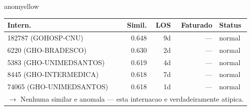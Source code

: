 \documentclass[a4paper,10pt]{article}
\begin{document}
\begin{anomalycard}[Internacao 5751 | GHO-PETROBRAS | MODERADO (z=2.04)]{anomyellow}
\begin{tabular}{l r r r l}\toprule\textbf{Intern.} & \textbf{Simil.} & \textbf{LOS} & \textbf{Faturado} & \textbf{Status} \\\midrule
182787 (GOHOSP-CNU) & 0.648 & 9d & --- & \textcolor{jcubeblue}{normal} \\
6220 (GHO-BRADESCO) & 0.630 & 2d & --- & \textcolor{jcubeblue}{normal} \\
5383 (GHO-UNIMEDSANTOS) & 0.619 & 4d & --- & \textcolor{jcubeblue}{normal} \\
8445 (GHO-INTERMEDICA) & 0.618 & 7d & --- & \textcolor{jcubeblue}{normal} \\
74065 (GHO-UNIMEDSANTOS) & 0.618 & 1d & --- & \textcolor{jcubeblue}{normal} \\
\multicolumn{5}{l}{\textcolor{jcubeblue}{\small $\rightarrow$ Nenhuma similar e anomala --- esta internacao e verdadeiramente atipica.}} \\
\bottomrule\end{tabular}


\end{anomalycard}

\newpage
\end{document}
